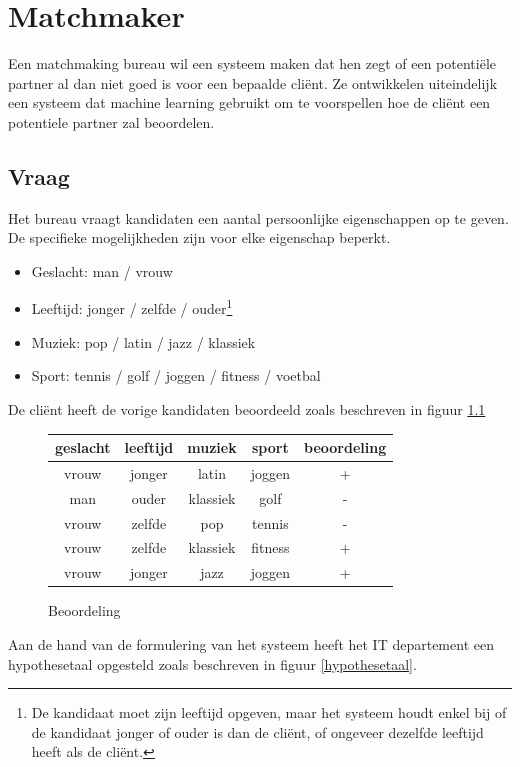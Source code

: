 \documentclass[alternative-exam.tex]{subfiles}
\begin{document}
\chapter{Matchmaker}
Een matchmaking bureau wil een systeem maken dat hen zegt of een potenti\"ele partner al dan niet goed is voor een bepaalde cli\"ent. Ze ontwikkelen uiteindelijk een systeem dat machine learning gebruikt om te voorspellen hoe de cli\"ent een potentiele partner zal beoordelen.

\section{Vraag}
Het bureau vraagt kandidaten een aantal persoonlijke eigenschappen op te geven.
De specifieke mogelijkheden zijn voor elke eigenschap beperkt.
\begin{itemize}
\item Geslacht: man / vrouw
\item Leeftijd: jonger / zelfde / ouder\footnote{De kandidaat moet zijn leeftijd opgeven, maar het systeem houdt enkel bij of de kandidaat jonger of ouder is dan de cli\"ent, of ongeveer dezelfde leeftijd heeft als de cli\"ent.}
\item Muziek: pop / latin / jazz  / klassiek
\item Sport: tennis / golf / joggen / fitness / voetbal
\end{itemize}
De cli\"ent heeft de vorige kandidaten beoordeeld zoals beschreven in figuur \ref{beoordeling}
\begin{figure}[H]
\centering
\caption{Beoordeling}
\label{beoordeling}
\begin{tabular}{|c|c|c|c|c|}
\hline
geslacht & leeftijd & muziek & sport & beoordeling\\
\hline
vrouw & jonger & latin & joggen & +\\
man & ouder & klassiek & golf & -\\
vrouw & zelfde & pop & tennis & -\\
vrouw & zelfde & klassiek & fitness & +\\
vrouw & jonger & jazz & joggen & +\\
\hline
\end{tabular}
\end{figure}
Aan de hand van de formulering van het systeem heeft het IT departement een hypothesetaal opgesteld zoals beschreven in figuur \ref{hypothesetaal}.
\end{document}

